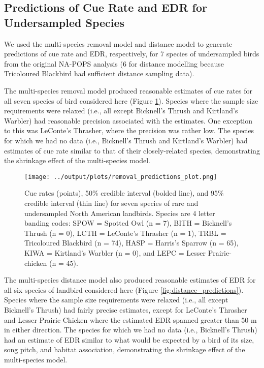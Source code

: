 \documentclass[12pt]{article}
\begin{document}
\subsection{Predictions of Cue Rate and EDR for Undersampled Species}

\par We used the multi-species removal model and distance model to generate predictions of cue rate and EDR, respectively, for 7 species of undersampled birds from the original NA-POPS analysis (6 for distance modelling because Tricoloured Blackbird had sufficient distance sampling data).

\par The multi-species removal model produced reasonable estimates of cue rates for all seven species of bird considered here (Figure \ref{fig:removal_predictions}).
Species where the sample size requirements were relaxed (i.e., all except Bicknell's Thrush and Kirtland's Warbler) had reasonable precision associated with the estimates.
One exception to this was LeConte's Thrasher, where the precision was rather low.
The species for which we had no data (i.e., Bicknell's Thrush and Kirtland's Warbler) had estimates of cue rate similar to that of their closely-related species, demonstrating the shrinkage effect of the multi-species model.

\begin{figure}[h!]
	\texttt{[image: ../output/plots/removal\_predictions\_plot.png]}
	\caption{Cue rates (points), 50\% credible interval (bolded line), and 95\% credible interval (thin line) for seven species of rare and undersampled North American landbirds. Species are 4 letter banding codes: SPOW = Spotted Owl (n = 7), BITH = Bicknell's Thrush (n = 0), LCTH = LeConte's Thrasher (n = 1), TRBL = Tricoloured Blackbird (n = 74), HASP = Harris's Sparrow (n = 65), KIWA = Kirtland's Warbler (n = 0), and LEPC = Lesser Prairie-chicken (n = 45).}
	\label{fig:removal_predictions}
\end{figure}

\par The multi-species distance model also produced reasonable estimates of EDR for all six species of landbird considered here (Figure \ref{fig:distance_predictions}).
Species where the sample size requirements were relaxed (i.e., all except Bicknell's Thrush) had fairly precise estimates, except for LeConte's Thrasher and Lesser Prairie Chicken where the estimated EDR spanned greater than 50 m in either direction.
The species for which we had no data (i.e., Bicknell's Thrush) had an estimate of EDR similar to what would be expected by a bird of its size, song pitch, and habitat association, demonstrating the shrinkage effect of the multi-species model.
\end{document}
